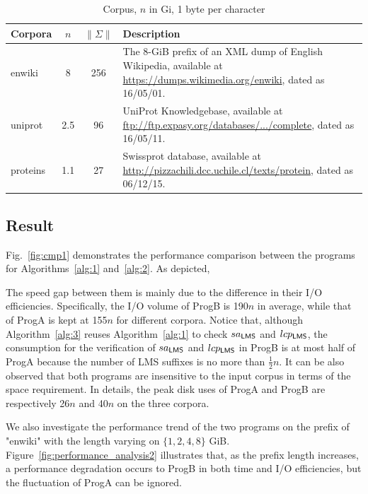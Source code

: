 \documentclass[10pt,journal,compsoc]{IEEEtran}
\begin{document}
\renewcommand\arraystretch{1.3}
\begin{table}[!t]
	\caption{Corpus, $n$ in Gi, 1 byte per character}
	\label{tbl:1}
	\centering
	\begin{tabular}{|l|c|c|p{10cm}|}
		\hline
		Corpora & \multicolumn{1}{c|}{$n$} & \multicolumn{1}{c|}{$\|\Sigma\|$} & Description \\\hline
		enwiki & 8 & 256 & The 8-GiB prefix of an XML dump of English Wikipedia, available at \url{https://dumps.wikimedia.org/enwiki}, dated as 16/05/01. \\\hline	
		uniprot & 2.5 & 96 & UniProt Knowledgebase, available at \url{ftp://ftp.expasy.org/databases/.../complete}, dated as 16/05/11. \\\hline
		proteins & 1.1 & 27 & Swissprot database, available at \url{http://pizzachili.dcc.uchile.cl/texts/protein}, dated as 06/12/15. \\\hline
	\end{tabular}
\end{table}

\subsection{Result} \label{sec:experiments:result}

Fig.~\ref{fig:cmp1} demonstrates the performance comparison between the programs for Algorithms~\ref{alg:1} and~\ref{alg:2}. As depicted,







The speed gap between them is mainly due to the difference in their I/O efficiencies. Specifically, the I/O volume of ProgB is 190$n$ in average, while that of ProgA is kept at 155$n$ for different corpora. Notice that, although Algorithm~\ref{alg:3} reuses Algorithm~\ref{alg:1} to check $sa_{\sf LMS}$ and $lcp_{\sf LMS}$, the consumption for the verification of $sa_{\sf LMS}$ and $lcp_{\sf LMS}$ in ProgB is at most half of ProgA because the number of LMS suffixes is no more than $\frac{1}{2}n$. It can be also observed that both programs are insensitive to the input corpus in terms of the space requirement. In details, the peak disk uses of ProgA and ProgB are respectively 26$n$ and 40$n$ on the three corpora.

We also investigate the performance trend of the two programs on the prefix of "enwiki" with the length varying on $\{1, 2, 4, 8\}$ GiB. Figure~\ref{fig:performance_analysis2} illustrates that, as the prefix length increases, a performance degradation occurs to ProgB in both time and I/O efficiencies, but the fluctuation of ProgA can be ignored.
\end{document}
